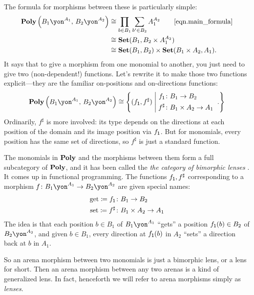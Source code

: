\documentclass[Book-Poly]{subfiles}
\begin{document}
The formula for morphisms between these is particularly simple:
\begin{align*}
  \poly\left(B_1\yon^{A_1},\,B_2\yon^{A_2}\right) &\iso \prod_{b \in B_1} \sum_{b' \in B_2} A_1^{A_2} \tag*{\eqref{eqn.main_formula}} \\
  &\iso \smset(B_1, B_2 \times A_1^{A_2}) \\
  &\iso \smset(B_1,B_2)\times\smset(B_1\times A_2,A_1).
\end{align*}
It says that to give a morphism from one monomial to another, you just need to give two (non-dependent!) functions. Let's rewrite it to make those two functions explicit---they are the familiar on-positions and on-directions functions:
\[
  \poly\left(B_1\yon^{A_1},\,B_2\yon^{A_2}\right)
  \iso
  \left\{
    (f_\1,f^\sharp)
  \;\middle|\;
  	\parbox{1.2in}{
    $
    \begin{aligned}
  	  f_\1&\colon B_1\to B_2\\
  	  f^\sharp&\colon B_1\times A_2\to A_1
    \end{aligned}
    $
  }.
  \right\}
\]
Ordinarily, $f^\sharp$ is more involved: its type depends on the directions at each position of the domain and its image position via $f_{\textsf{1}}$.
But for monomials, every position has the same set of directions, so $f^\sharp$ is just a standard function.

The monomials in $\mathbf{Poly}$ and the morphisms between them form a full subcategory of $\mathbf{Poly}$, and it has been called the \emph{the category of bimorphic lenses} \cite{hedges2018limits}. It comes up in functional programming. The functions $f_{\textsf{1}}, f^\sharp$ corresponding to a morphism $f \colon B_1\yon^{A_1}\to B_2\yon^{A_2}$ are given special names:
\begin{equation}\label{eqn.bimorphic_lens}
\begin{aligned}
	\text{get} \coloneqq f_{\textsf{1}} &\colon B_1\to B_2\\
	\text{set} \coloneqq f^\sharp &\colon B_1\times A_2\to A_1
\end{aligned}
\end{equation}
The idea is that each position $b \in B_1$ of $B_1\yon^{A_1}$ ``gets'' a position $f_{\textsf{1}}(b) \in B_2$ of $B_2\yon^{A_2}$, and given $b \in B_1$, every direction at $f_{\textsf{1}}(b)$ in $A_2$ ``sets'' a direction back at $b$ in $A_1$.

So an arena morphism between two monomials is just a bimorphic lens, or a lens for short.
Then an arena morphism between any two arenas is a kind of generalized lens.
In fact, henceforth we will refer to arena morphisms simply as \emph{lenses}.
\end{document}
